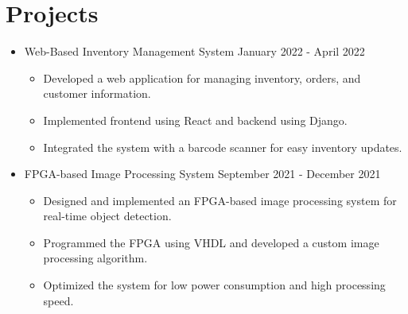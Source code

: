 \documentclass[a4paper,12pt]{article} %
\begin{document}
\section*{Projects}
\begin{itemize}[leftmargin=*]
    \item Web-Based Inventory Management System \hfill January 2022 - April 2022
          \begin{itemize}
              \item Developed a web application for managing inventory, orders, and customer information.
              \item Implemented frontend using React and backend using Django.
              \item Integrated the system with a barcode scanner for easy inventory updates.
          \end{itemize}
    \item FPGA-based Image Processing System \hfill September 2021 - December 2021
          \begin{itemize}
              \item Designed and implemented an FPGA-based image processing system for real-time object detection.
              \item Programmed the FPGA using VHDL and developed a custom image processing algorithm.
              \item Optimized the system for low power consumption and high processing speed.
          \end{itemize}
\end{itemize}
\end{document}
